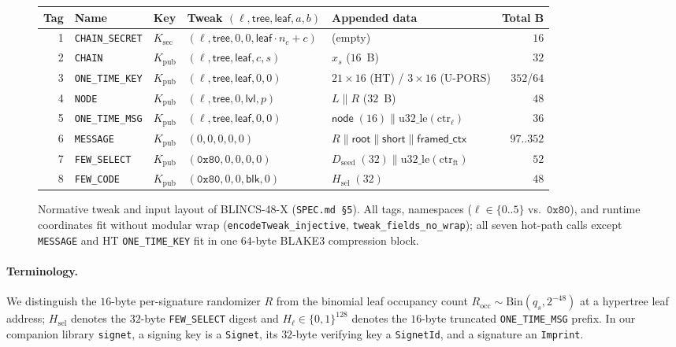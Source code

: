 \documentclass[11pt,a4paper]{article}
\theoremstyle{definition}
\theoremstyle{remark}
\newcommand{\BLINCS}{\textsf{BLINCS-48-X}}
\newcommand{\UPORS}{\textsf{U-PORS}}
\newcommand{\BLAKE}{\textsf{BLAKE3}}
\newcommand{\bits}{\{0,1\}}
\begin{document}
\begin{figure}[t]
\centering
\footnotesize
\setlength{\tabcolsep}{4pt}
\begin{tabular}{@{}rllp{3.45cm}p{4.25cm}r@{}}
\toprule
Tag & Name & Key & Tweak $(\ell, \mathsf{tree}, \mathsf{leaf}, a, b)$ & Appended data & Total B \\
\midrule
1 & \texttt{CHAIN\_SECRET} & $K_{\mathrm{sec}}$ & $(\ell, \mathsf{tree}, 0, 0, \mathsf{leaf}\!\cdot\!n_c{+}c)$ & (empty) & $16$ \\
2 & \texttt{CHAIN} & $K_{\mathrm{pub}}$ & $(\ell, \mathsf{tree}, \mathsf{leaf}, c, s)$ & $x_s$ ($16$~B) & $32$ \\
3 & \texttt{ONE\_TIME\_KEY} & $K_{\mathrm{pub}}$ & $(\ell, \mathsf{tree}, \mathsf{leaf}, 0, 0)$ & $21{\times}16$ (HT) / $3{\times}16$ (\UPORS{}) & $352$/$64$ \\
4 & \texttt{NODE} & $K_{\mathrm{pub}}$ & $(\ell, \mathsf{tree}, 0, \mathsf{lvl}, p)$ & $L \parallel R$ ($32$~B) & $48$ \\
5 & \texttt{ONE\_TIME\_MSG} & $K_{\mathrm{pub}}$ & $(\ell, \mathsf{tree}, \mathsf{leaf}, 0, 0)$ & $\mathsf{node}\;(16) \parallel \mathrm{u32\_le}(\mathrm{ctr}_\ell)$ & $36$ \\
6 & \texttt{MESSAGE} & $K_{\mathrm{pub}}$ & $(0, 0, 0, 0, 0)$ & $R \parallel \mathsf{root} \parallel \mathsf{short} \parallel \mathsf{framed\_ctx}$ & $97..352$ \\
7 & \texttt{FEW\_SELECT} & $K_{\mathrm{pub}}$ & $(\mathtt{0x80}, 0, 0, 0, 0)$ & $D_{\mathrm{seed}}\;(32) \parallel \mathrm{u32\_le}(\mathrm{ctr}_{\mathrm{ft}})$ & $52$ \\
8 & \texttt{FEW\_CODE} & $K_{\mathrm{pub}}$ & $(\mathtt{0x80}, 0, 0, \mathsf{blk}, 0)$ & $H_{\mathrm{sel}}\;(32)$ & $48$ \\
\bottomrule
\end{tabular}
\caption{Normative tweak and input layout of \BLINCS{} (\texttt{SPEC.md §5}). All tags, namespaces ($\ell \in \{0..5\}$ vs.\ $\mathtt{0x80}$), and runtime coordinates fit without modular wrap (\texttt{encodeTweak\_injective}, \texttt{tweak\_fields\_no\_wrap}); all seven hot-path calls except \texttt{MESSAGE} and HT \texttt{ONE\_TIME\_KEY} fit in one $64$-byte \BLAKE{} compression block.}
\label{fig:tweak}
\end{figure}

\paragraph{Terminology.}
We distinguish the $16$-byte per-signature randomizer $R$ from the binomial leaf occupancy count $R_{\mathrm{occ}} \sim \mathrm{Bin}(q_s, 2^{-48})$ at a hypertree leaf address; $H_{\mathrm{sel}}$ denotes the $32$-byte \texttt{FEW\_SELECT} digest and $H_\ell \in \bits^{128}$ denotes the $16$-byte truncated \texttt{ONE\_TIME\_MSG} prefix. In our companion library \texttt{signet}, a signing key is a \texttt{Signet}, its $32$-byte verifying key a \texttt{SignetId}, and a signature an \texttt{Imprint}.
\end{document}

